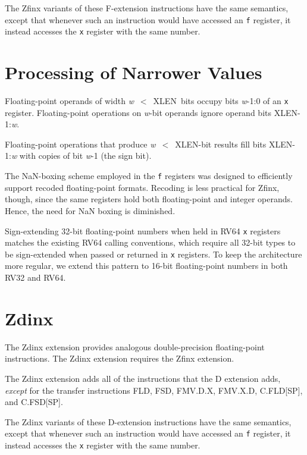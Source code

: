 The Zfinx variants of these F-extension instructions have the same semantics,
except that whenever such an instruction would have accessed an {\tt f}
register, it instead accesses the {\tt x} register with the same number.

\section{Processing of Narrower Values}

Floating-point operands of width \mbox{{\em w} $<$ XLEN bits} occupy bits
\mbox{{\em w}-1:0} of an {\tt x} register.
Floating-point operations on {\em w}-bit operands ignore operand bits
\mbox{XLEN-1:{\em w}}.

Floating-point operations that produce \mbox{{\em w} $<$ XLEN-bit} results
fill bits \mbox{XLEN-1:{\em w}} with copies of bit \mbox{{\em w}-1} (the
sign bit).

\begin{commentary}
The NaN-boxing scheme employed in the {\tt f} registers was designed to
efficiently support recoded floating-point formats.
Recoding is less practical for Zfinx, though, since the same registers
hold both floating-point and integer operands.
Hence, the need for NaN boxing is diminished.

Sign-extending 32-bit floating-point numbers when held in RV64 {\tt x}
registers matches the existing RV64 calling conventions, which require all
32-bit types to be sign-extended when passed or returned in {\tt x} registers.
To keep the architecture more regular, we extend this pattern to 16-bit
floating-point numbers in both RV32 and RV64.
\end{commentary}

\section{Zdinx}

The Zdinx extension provides analogous double-precision floating-point
instructions.
The Zdinx extension requires the Zfinx extension.

The Zdinx extension adds all of the instructions that the D extension
adds, {\em except} for the transfer instructions FLD, FSD, FMV.D.X,
FMV.X.D, C.FLD[SP], and C.FSD[SP].

The Zdinx variants of these D-extension instructions have the same semantics,
except that whenever such an instruction would have accessed an {\tt f}
register, it instead accesses the {\tt x} register with the same number.

